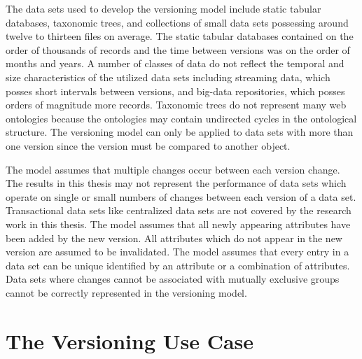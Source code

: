 The data sets used to develop the versioning model include static tabular databases, taxonomic trees, and collections of small data sets possessing around twelve to thirteen files on average.
The static tabular databases contained on the order of thousands of records and the time between versions was on the order of months and years.
A number of classes of data do not reflect the temporal and size characteristics of the utilized data sets including streaming data, which posses short intervals between versions, and big-data repositories, which posses orders of magnitude more records.
Taxonomic trees do not represent many web ontologies because the ontologies may contain undirected cycles in the ontological structure.
The versioning model can only be applied to data sets with more than one version since the version must be compared to another object.

The model assumes that multiple changes occur between each version change.
The results in this thesis may not represent the performance of data sets which operate on single or small numbers of changes between each version of a data set.
Transactional data sets like centralized data sets are not covered by the research work in this thesis.
The model assumes that all newly appearing attributes have been added by the new version.
All attributes which do not appear in the new version are assumed to be invalidated.
The model assumes that every entry in a data set can be unique identified by an attribute or a combination of attributes.
Data sets where changes cannot be associated with mutually exclusive groups cannot be correctly represented in the versioning model.


\section{The Versioning Use Case} \label{sec:usecase}

